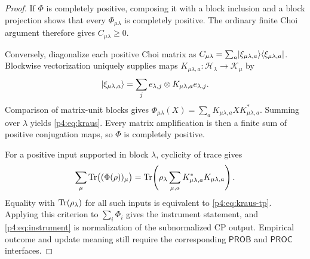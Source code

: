 \documentclass[12pt,a4paper]{article}
\begin{document}
\begin{proof}
If \(\Phi\) is completely positive, composing it with a block inclusion and
a block projection shows that every \(\Phi_{\mu\lambda}\) is completely
positive.  The ordinary finite Choi argument therefore gives
\(C_{\mu\lambda}\ge0\).

Conversely, diagonalize each positive Choi matrix as
\(C_{\mu\lambda}=\sum_a
\lvert \xi_{\mu\lambda,a} \rangle\langle \xi_{\mu\lambda,a} \rvert\).
Blockwise vectorization uniquely supplies maps
\(K_{\mu\lambda,a}:\mathcal H_\lambda\to\mathcal K_\mu\) by
\[
\lvert \xi_{\mu\lambda,a} \rangle
=\sum_j e_{\lambda,j}\otimes K_{\mu\lambda,a}e_{\lambda,j}.
\]
Comparison of matrix-unit blocks gives
\(\Phi_{\mu\lambda}(X)=\sum_aK_{\mu\lambda,a}X
K_{\mu\lambda,a}^*\).  Summing over \(\lambda\) yields
\eqref{p4:eq:kraus}.  Every matrix amplification is then a finite sum of
positive conjugation maps, so \(\Phi\) is completely positive.

For a positive input supported in block \(\lambda\), cyclicity of trace gives
\[
\sum_\mu\operatorname{Tr}\bigl((\Phi(\rho))_\mu\bigr)
=\operatorname{Tr}\!\left(
\rho_\lambda\sum_{\mu,a}K_{\mu\lambda,a}^*K_{\mu\lambda,a}
\right).
\]
Equality with \(\operatorname{Tr}(\rho_\lambda)\) for all such inputs is equivalent to
\eqref{p4:eq:kraus-tp}.  Applying this criterion to
\(\sum_i\Phi_i\) gives the instrument statement, and
\eqref{p4:eq:instrument} is normalization of the subnormalized CP output.
Empirical outcome and update meaning still require the corresponding
\(\mathsf{PROB}\) and \(\mathsf{PROC}\) interfaces.
\end{proof}
\end{document}
